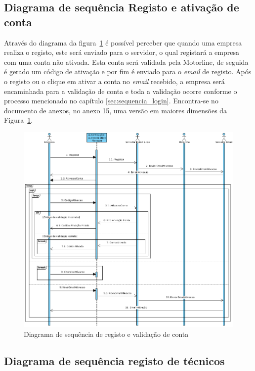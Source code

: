 \newpage

\subsection{Diagrama de sequência Registo e ativação de conta}

Através do diagrama da figura~\ref{fig:44} é possível perceber que quando uma empresa realiza o registo, este será enviado para o servidor, o qual registará a empresa com uma conta não ativada. Esta conta será validada pela Motorline, de seguida é gerado um código de ativação e por fim é enviado para o \textit{email} de registo. Após o registo ou o clique em ativar a conta no \textit{email} recebido, a empresa será encaminhada para a validação de conta e toda a validação ocorre conforme o processo mencionado no capítulo \ref{sec:sequencia_login}. Encontra-se no documento de anexos, no anexo 15, uma versão em maiores dimensões da Figura~\ref*{fig:44}.


\begin{figure}[htb]
  \centering
  \includegraphics[width=\textwidth]{images/diagramas/sequencia/diagrama_registo.png}
  \caption{Diagrama de sequência de registo e validação de conta}
  \label{fig:44}
\end{figure}

\newpage

\subsection{Diagrama de sequência registo de técnicos}

